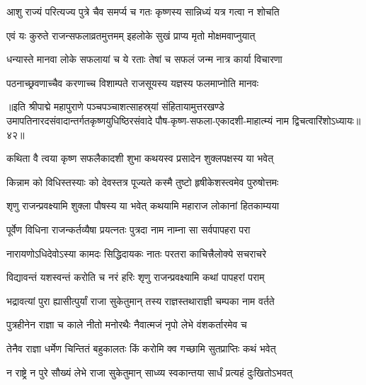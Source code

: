 \twolineshloka
{आशु राज्यं परित्यज्य पुत्रे चैव समर्प्य च}
{गतः कृष्णस्य सान्निध्यं यत्र गत्वा न शोचति}%

\twolineshloka
{एवं यः कुरुते राजन्सफलाव्रतमुत्तमम्}
{इहलोके सुखं प्राप्य मृतो मोक्षमवाप्नुयात्}%

\twolineshloka
{धन्यास्ते मानवा लोके सफलायां च ये रताः}
{तेषां च सफलं जन्म नात्र कार्या विचारणा}%

\twolineshloka
{पठनाच्छ्रवणाच्चैव करणाच्च विशाम्पते}
{राजसूयस्य यज्ञस्य फलमाप्नोति मानवः}%

॥इति श्रीपाद्मे महापुराणे पञ्चपञ्चाशत्साहस्र्यां संहितायामुत्तरखण्डे उमापतिनारदसंवादान्तर्गतकृष्णयुधिष्ठिरसंवादे पौष-कृष्ण-सफला-एकादशी-माहात्म्यं नाम द्विचत्वारिंशोऽध्यायः॥४२॥

\hyperref[sec:ekadashi_mahatmyam_padma_puranam]{\closesub}
\clearpage

\label{sec:padma-pausha-shukla-putrada}



\twolineshloka
{कथिता वै त्वया कृष्ण सफलैकादशी शुभा}
{कथयस्व प्रसादेन शुक्लपक्षस्य या भवेत्}%

\twolineshloka
{किन्नाम को विधिस्तस्याः को देवस्तत्र पूज्यते}
{कस्मै तुष्टो हृषीकेशस्त्वमेव पुरुषोत्तमः}%


\twolineshloka
{शृणु राजन्प्रवक्ष्यामि शुक्ला पौषस्य या भवेत्}
{कथयामि महाराज लोकानां हितकाम्यया}%

\twolineshloka
{पूर्वेण विधिना राजन्कर्तव्यैषा प्रयत्नतः}
{पुत्रदा नाम नाम्ना सा सर्वपापहरा परा}%

\twolineshloka
{नारायणोऽधिदेवोऽस्या कामदः सिद्धिदायकः}
{नातः परतरा काचित्त्रैलोक्ये सचराचरे}%

\twolineshloka
{विद्यावन्तं यशस्वन्तं करोति च नरं हरिः}
{शृणु राजन्प्रवक्ष्यामि कथां पापहरां पराम्}%

\twolineshloka
{भद्रावत्यां पुरा ह्यासीत्पुर्यां राजा सुकेतुमान्}
{तस्य राज्ञस्तथाराज्ञी चम्पका नाम वर्तते}%

\twolineshloka
{पुत्रहीनेन राज्ञा च काले नीतो मनोरथैः}
{नैवात्मजं नृपो लेभे वंशकर्तारमेव च}%

\twolineshloka
{तेनैव राज्ञा धर्मेण चिन्तितं बहुकालतः}
{किं करोमि क्व गच्छामि सुतप्राप्तिः कथं भवेत्}%

\twolineshloka
{न राष्ट्रे न पुरे सौख्यं लेभे राजा सुकेतुमान्}
{साध्व्य स्वकान्तया सार्धं प्रत्यहं दुःखितोऽभवत्}%

